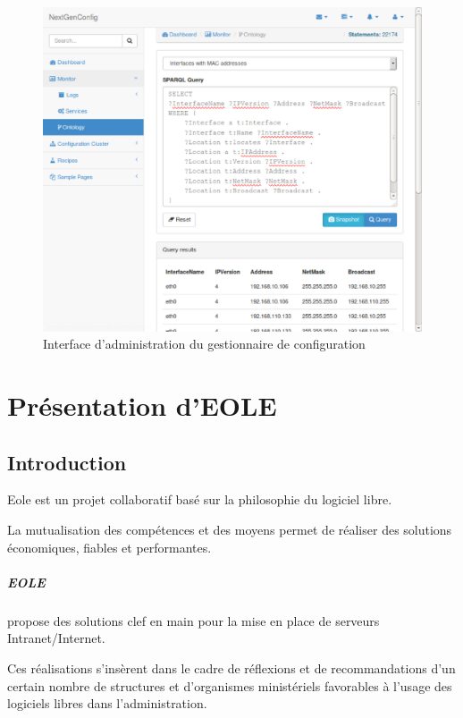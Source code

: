 \begin{figure}[H]
    \centerline{\includegraphics[width=\textwidth]{img/trifle_gui}}
    \caption{Interface d'administration du gestionnaire de configuration}
    \label{fig:trifle_gui}
\end{figure}



\chapter{Présentation d'EOLE}
\label{appendix:EOLE}

\section{Introduction}

Eole est un projet collaboratif basé sur la philosophie du logiciel libre.

La mutualisation des compétences et des moyens permet de réaliser des solutions
économiques, fiables et performantes.

\paragraph{EOLE} propose des solutions clef en main pour la mise en place de
serveurs Intranet/Internet.

Ces réalisations s’insèrent dans le cadre de réflexions et de recommandations
d’un certain nombre de structures et d’organismes ministériels favorables à
l’usage des logiciels libres dans l’administration.

